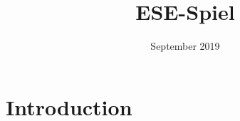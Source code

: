 \documentclass{article}
\title{ESE-Spiel}
\author{ }
\date{September 2019}
\begin{document}
\maketitle

\section{Introduction}




\newpage

\end{document}
